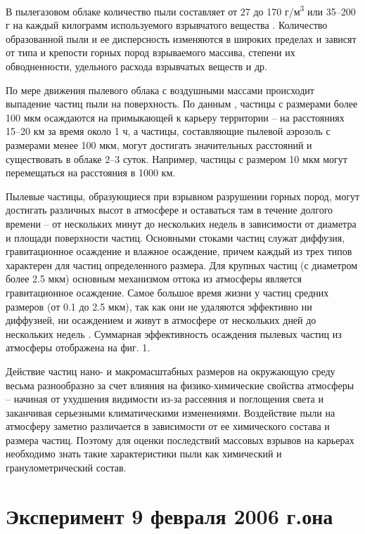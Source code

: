 В пылегазовом облаке количество пыли составляет от 27 до 170 г/м\textsuperscript{3} или 35–200 г на каждый килограмм используемого взрывчатого вещества \cite{bib01}. Количество образованной пыли и ее дисперсность изменяются в широких пределах и зависят от типа и крепости горных пород взрываемого массива, степени их обводненности, удельного расхода взрывчатых веществ и др.

По мере движения пылевого облака с воздушными массами происходит выпадение частиц пыли на поверхность. По данным \cite{bib06}, частицы с размерами более 100 мкм осаждаются на примыкающей к карьеру территории – на расстояниях 15–20 км за время около 1 ч, а частицы, составляющие пылевой аэрозоль с размерами менее 100 мкм, могут достигать значительных расстояний и существовать в облаке 2–3 суток. Например, частицы с размером 10 мкм могут перемещаться на расстояния в 1000 км.

Пылевые частицы, образующиеся при взрывном разрушении горных пород, могут достигать различных высот в атмосфере и оставаться там в течение долгого времени – от нескольких минут до нескольких недель в зависимости от диаметра и площади поверхности частиц. Основными стоками частиц служат диффузия, гравитационное осаждение и влажное осаждение, причем каждый из трех типов характерен для частиц определенного размера. Для крупных частиц (с диаметром более 2.5 мкм) основным механизмом оттока из атмосферы является гравитационное осаждение. Самое большое время жизни у частиц средних размеров (от 0.1 до 2.5 мкм), так как они не удаляются эффективно ни диффузией, ни осаждением и живут в атмосфере от нескольких дней до нескольких недель \cite{bib08}. Суммарная эффективность осаждения пылевых частиц из атмосферы отображена на фиг. 1. 

Действие частиц нано- и макромасштабных размеров на окружающую среду весьма разнообразно за счет влияния на физико-химические свойства атмосферы – начиная от ухудшения видимости из-за рассеяния и поглощения света и заканчивая серьезными климатическими изменениями. Воздействие пыли на атмосферу заметно различается в зависимости от ее химического состава и размера частиц. Поэтому для оценки последствий массовых взрывов на карьерах необходимо знать такие характеристики пыли как химический и гранулометрический состав. 

\section{Эксперимент 9 февраля 2006 г.она} \label{sect2_2}

